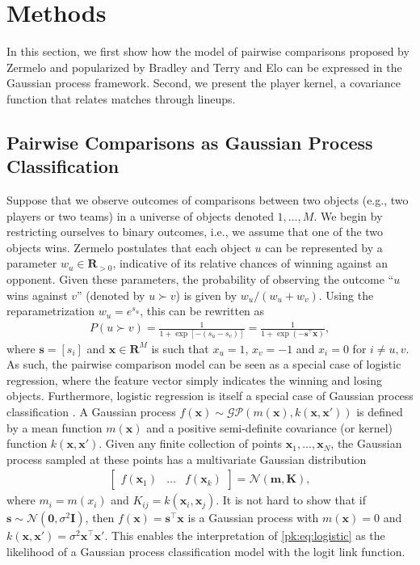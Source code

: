 \section{Methods}
\label{pk:sec:methods}

In this section, we first show how the model of pairwise comparisons proposed by Zermelo \cite{zermelo1928berechnung} and popularized by Bradley and Terry \cite{bradley1952rank} and Elo \cite{elo1978rating} can be expressed in the Gaussian process framework.
Second, we present the player kernel, a covariance function that relates matches through lineups.


\subsection{Pairwise Comparisons as Gaussian Process Classification}

Suppose that we observe outcomes of comparisons between two objects (e.g., two players or two teams) in a universe of objects denoted $1, \ldots, M$.
We begin by restricting ourselves to binary outcomes, i.e., we assume that one of the two objects wins.
Zermelo \cite{zermelo1928berechnung} postulates that each object $u$ can be represented by a parameter $w_u \in \mathbf{R}_{>0}$, indicative of its relative chances of winning against an opponent.
Given these parameters, the probability of observing the outcome ``$u$ wins against $v$'' (denoted by $u \succ v$) is given by $w_u / (w_u + w_v)$.
Using the reparametrization $w_u = e^{s_u}$, this can be rewritten as
\begin{align}
\label{pk:eq:logistic}
P(u \succ v) = \frac{1}{1 + \exp[-(s_u - s_v)]} = \frac{1}{1 + \exp(- \bm{s}^\top \bm{x})},
\end{align}
where $\bm{s} = [s_i]$ and $\bm{x} \in \mathbf{R}^M$ is such that $x_u = 1$, $x_v = -1$ and $x_i = 0$ for $i \ne u, v$.
As such, the pairwise comparison model can be seen as a special case of logistic regression, where the feature vector simply indicates the winning and losing objects.
Furthermore, logistic regression is itself a special case of Gaussian process classification \cite[Ch. 3]{rasmussen2006gaussian}.
A Gaussian process $f(\bm{x}) \sim \mathcal{GP}(m(\bm{x}), k(\bm{x}, \bm{x}'))$ is defined by a mean function $m(\bm{x})$ and a positive semi-definite covariance (or kernel) function $k(\bm{x}, \bm{x}')$.
Given any finite collection of points $\bm{x}_1, \ldots, \bm{x}_N$, the Gaussian process sampled at these points has a multivariate Gaussian distribution
\begin{align*}
\begin{bmatrix}
f(\bm{x}_1) & \dots & f(\bm{x}_k)
\end{bmatrix} = \mathcal{N}(\bm{m}, \bm{K}),
\end{align*}
where $m_i = m(x_i)$ and $K_{ij} = k(\bm{x}_i, \bm{x}_j)$.
It is not hard to show that if $\bm{s} \sim \mathcal{N}(\bm{0}, \sigma^2 \bm{I})$, then $f(\bm{x}) = \bm{s}^\top \bm{x}$ is a Gaussian process with $m(\bm{x}) = 0$ and $k(\bm{x}, \bm{x}') = \sigma^2 \bm{x}^\top \bm{x}'$.
This enables the interpretation of \eqref{pk:eq:logistic} as the likelihood of a Gaussian process classification model with the logit link function.

